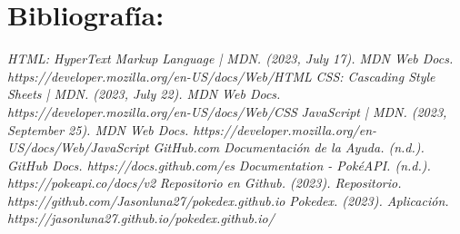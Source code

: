 \documentclass[12pt]{article}
\begin{document}
    \section{Bibliografía:}
    \begin{thebibliography}{X}
            \textit{HTML: HyperText Markup Language | MDN. (2023, July 17). MDN Web Docs. https://developer.mozilla.org/en-US/docs/Web/HTML}
            \textit{CSS: Cascading Style Sheets | MDN. (2023, July 22). MDN Web Docs. https://developer.mozilla.org/en-US/docs/Web/CSS}
            \textit{JavaScript | MDN. (2023, September 25). MDN Web Docs. https://developer.mozilla.org/en-US/docs/Web/JavaScript}
            \textit{GitHub.com Documentación de la Ayuda. (n.d.). GitHub Docs. https://docs.github.com/es}
            \textit{Documentation - PokéAPI. (n.d.). https://pokeapi.co/docs/v2}
            \textit{Repositorio en Github. (2023). Repositorio. https://github.com/Jasonluna27/pokedex.github.io}
            \textit{Pokedex. (2023). Aplicación. https://jasonluna27.github.io/pokedex.github.io/}
    \end{thebibliography}
\end{document}
